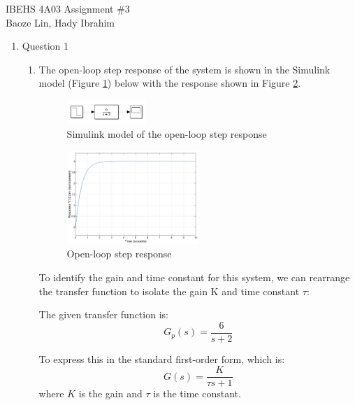 \documentclass[12pt]{article}
\begin{document}
IBEHS 4A03 \hfill Assignment \#3\\
Baoze Lin, Hady Ibrahim

\hrulefill

\renewcommand{\theenumii}{\arabic{enumi}.\arabic{enumii}}

\begin{enumerate}
\item Question 1
  \begin{enumerate}
    \item
    The open-loop step response of the system is shown in the Simulink model (Figure \ref{fig:figure1_1}) below with the response shown in Figure \ref{fig:figure1_2}.
    
    \begin{figure}[H]
      \centering
      \includegraphics[width=0.3\textwidth]{Figures/Models/model1_1.png}
      \caption{Simulink model of the open-loop step response}
      \label{fig:figure1_1}
    \end{figure}

    \begin{figure}[H]
      \centering
      \includegraphics[width=0.5\textwidth]{Figures/figure1_1.png}
      \caption{Open-loop step response}
      \label{fig:figure1_2}
    \end{figure}

    To identify the gain and time constant for this system, we can rearrange the transfer function to isolate the gain K and time constant $\tau$:

    The given transfer function is:
    \[
    G_p(s) = \frac{6}{s + 2}
    \]

    To express this in the standard first-order form, which is:
    \[
    G(s) = \frac{K}{\tau s + 1}
    \]
    where \( K \) is the gain and \( \tau \) is the time constant.


\end{enumerate}
\end{enumerate}
\end{document}
